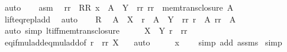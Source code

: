 \begin{isabellebody}
\ auto\isanewline
\ \ \isamarkupfalse%
\ asm\ \isamarkupfalse%
\ rr\ \ RR{\isacharcolon}{\kern0pt}\ {\isachardoublequoteopen}x\ {\isacharequal}{\kern0pt}\ A\ {\isacharasterisk}{\kern0pt}\ Y\ {\isacharplus}{\kern0pt}\ rr{\isachardoublequoteclose}\ {\isachardoublequoteopen}rr\ {\isasymin}\ mem{\isacharunderscore}{\kern0pt}trans{\isacharunderscore}{\kern0pt}closure\ A{\isachardoublequoteclose}\isanewline
\ \ \ \ \isamarkupfalse%
\ lift{\isacharunderscore}{\kern0pt}eq{\isacharunderscore}{\kern0pt}repl{\isacharunderscore}{\kern0pt}add\ \isamarkupfalse%
\ auto\isanewline
\ \ \isamarkupfalse%
\ R\ \isamarkupfalse%
\ {\isachardoublequoteopen}A\ {\isacharasterisk}{\kern0pt}\ X\ {\isacharplus}{\kern0pt}\ r\ {\isacharequal}{\kern0pt}\ A\ {\isacharasterisk}{\kern0pt}\ Y\ {\isacharplus}{\kern0pt}\ rr{\isachardoublequoteclose}\ {\isachardoublequoteopen}r\ {\isacharless}{\kern0pt}\ A{\isachardoublequoteclose}\ {\isachardoublequoteopen}rr\ {\isacharless}{\kern0pt}\ A{\isachardoublequoteclose}\ \isamarkupfalse%
\ {\isacharparenleft}{\kern0pt}auto\ simp{\isacharcolon}{\kern0pt}\ lt{\isacharunderscore}{\kern0pt}iff{\isacharunderscore}{\kern0pt}mem{\isacharunderscore}{\kern0pt}trans{\isacharunderscore}{\kern0pt}closure{\isacharparenright}{\kern0pt}\isanewline
\ \ \isamarkupfalse%
\ \isamarkupfalse%
\ {\isachardoublequoteopen}X\ {\isacharequal}{\kern0pt}\ Y{\isachardoublequoteclose}\ {\isachardoublequoteopen}r\ {\isacharequal}{\kern0pt}\ rr{\isachardoublequoteclose}\ \isamarkupfalse%
\ eq{\isacharunderscore}{\kern0pt}if{\isacharunderscore}{\kern0pt}mul{\isacharunderscore}{\kern0pt}add{\isacharunderscore}{\kern0pt}eq{\isacharunderscore}{\kern0pt}mul{\isacharunderscore}{\kern0pt}add{\isacharbrackleft}{\kern0pt}of\ r\ {\isacharunderscore}{\kern0pt}\ rr\ X\ {\isacharunderscore}{\kern0pt}{\isacharbrackright}{\kern0pt}\ \isamarkupfalse%
\ auto\isanewline
\ \ \isamarkupfalse%
\ \isamarkupfalse%
\ {\isachardoublequoteopen}x\ {\isasymin}\ {}{\isachardoublequoteclose}\ \isamarkupfalse%
\ {\isacharparenleft}{\kern0pt}simp\ add{\isacharcolon}{\kern0pt}\ assms{\isacharparenright}{\kern0pt}\isanewline
{}\isamarkupfalse%
\ simp%
\endisatagproof
{\isafoldproof}%
%
\isadelimproof
\isanewline
%
\endisadelimproof
\isanewline
%
\isadelimtheory
\isanewline
%
\endisadelimtheory
%
\isatagtheory
{}\isamarkupfalse%
%
\endisatagtheory
{\isafoldtheory}%
%
\isadelimtheory
%
\endisadelimtheory
%
\end{isabellebody}%

